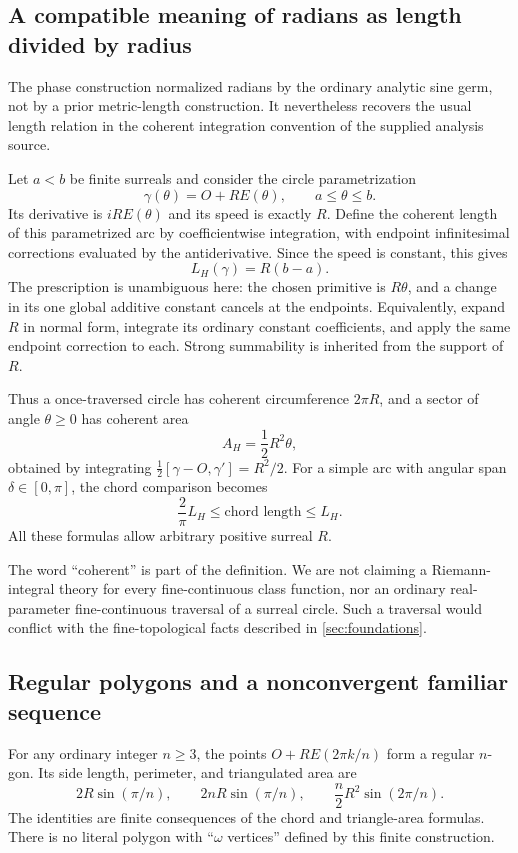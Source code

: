 \documentclass[11pt,letterpaper]{article}
\theoremstyle{definition}
\theoremstyle{remark}
\numberwithin{equation}{section}
\begin{document}
\subsection{A compatible meaning of radians as length divided by radius}
The phase construction normalized radians by the ordinary analytic sine germ, not by a prior metric-length construction. It nevertheless recovers the usual length relation in the coherent integration convention of the supplied analysis source.

Let $a<b$ be finite surreals and consider the circle parametrization
\[
 \gamma(\theta)=O+RE(\theta),\qquad a\le\theta\le b.
\]
Its derivative is $iRE(\theta)$ and its speed is exactly $R$. Define the coherent length of this parametrized arc by coefficientwise integration, with endpoint infinitesimal corrections evaluated by the antiderivative. Since the speed is constant, this gives
\begin{equation}\label{eq:arclength}
 L_H(\gamma)=R(b-a).
\end{equation}
The prescription is unambiguous here: the chosen primitive is $R\theta$, and a change in its one global additive constant cancels at the endpoints. Equivalently, expand $R$ in normal form, integrate its ordinary constant coefficients, and apply the same endpoint correction to each. Strong summability is inherited from the support of $R$.

Thus a once-traversed circle has coherent circumference $2\pi R$, and a sector of angle $\theta\ge0$ has coherent area
\[
 A_H=\frac12R^2\theta,
\]
obtained by integrating $\tfrac12[\gamma-O,\gamma'] = R^2/2$. For a simple arc with angular span $\delta\in[0,\pi]$, the chord comparison becomes
\[
 \frac2\pi L_H\le\text{chord length}\le L_H.
\]
All these formulas allow arbitrary positive surreal $R$.

The word ``coherent'' is part of the definition. We are not claiming a Riemann-integral theory for every fine-continuous class function, nor an ordinary real-parameter fine-continuous traversal of a surreal circle. Such a traversal would conflict with the fine-topological facts described in \cref{sec:foundations}.

\subsection{Regular polygons and a nonconvergent familiar sequence}
For any ordinary integer $n\ge3$, the points $O+RE(2\pi k/n)$ form a regular $n$-gon. Its side length, perimeter, and triangulated area are
\[
 2R\sin(\pi/n),\qquad
 2nR\sin(\pi/n),\qquad
 \frac n2R^2\sin(2\pi/n).
\]
The identities are finite consequences of the chord and triangle-area formulas. There is no literal polygon with ``$\omega$ vertices'' defined by this finite construction.
\end{document}
